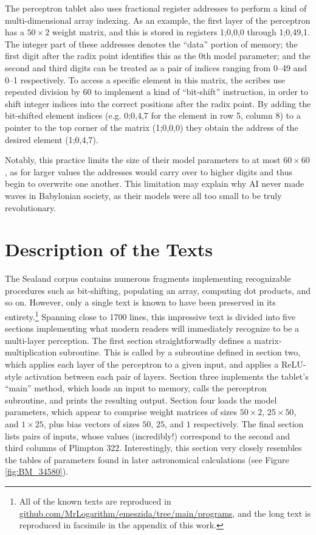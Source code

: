 \documentclass[11pt]{article}
\begin{document}
The perceptron tablet also uses fractional register addresses to perform a kind of multi-dimensional array indexing.
As an example, the first layer of the perceptron has a $50\times 2$ weight matrix, and this is stored in registers 1;0,0,0 through 1;0,49,1. The integer part of these addresses denotes the ``data'' portion of memory; the first digit after the radix point identifies this as the 0th model parameter; and the second and third digits can be treated as a pair of indices ranging from 0--49 and 0--1 respectively.
To access a specific element in this matrix, the scribes use repeated division by 60 to implement a kind of ``bit-shift'' instruction, in order to shift integer indices into the correct positions after the radix point. 
By adding the bit-shifted element indices (e.g. 0;0,4,7 for the element in row 5, column 8) to a pointer to the top corner of the matrix (1;0,0,0) they obtain the address of the desired element (1;0,4,7).

Notably, this practice limits the size of their model parameters to at most $60\times 60$, as for larger values the addresses would carry over to higher digits and thus begin to overwrite one another. 
This limitation may explain why AI never made waves in Babylonian society, as their models were all too small to be truly revolutionary.

\section{Description of the Texts}
The Sealand corpus contains numerous fragments implementing recognizable procedures such as bit-shifting, populating an array, computing dot products, and so on. 
However, only a single text is known to have been preserved in its entirety.\footnote{All of the known texts are reproduced in \url{github.com/MrLogarithm/emeszida/tree/main/programs}, and the long text is reproduced in facsimile in the appendix of this work.}
Spanning close to 1700 lines, this impressive text is divided into five sections implementing what modern readers will immediately recognize to be a multi-layer perception.
The first section straightforwadly defines a matrix-multiplication subroutine. 
This is called by a subroutine defined in section two, which applies each layer of the perceptron to a given input, and applies a ReLU-style activation between each pair of layers.
Section three implements the tablet's ``main'' method, which loads an input to memory, calls the perceptron subroutine, and prints the resulting output.
Section four loads the model parameters, which appear to comprise weight matrices of sizes $50\times 2$, $25\times 50$, and $1\times 25$, plus bias vectors of sizes $50$, $25$, and $1$ respectively.
The final section lists pairs of inputs, whose values (incredibly!) correspond to the second and third columns of Plimpton 322.
Interestingly, this section very closely resembles the tables of parameters found in later astronomical calculations (see Figure \ref{fig:BM_34580}).
\end{document}
